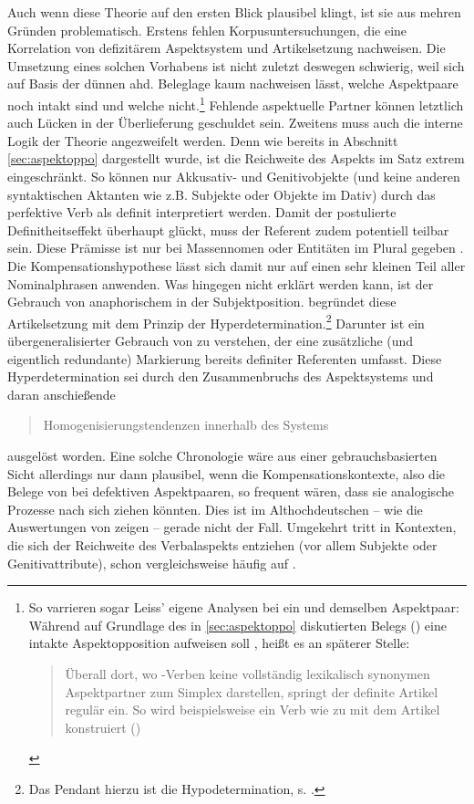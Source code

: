 Auch wenn diese Theorie auf den ersten Blick plausibel klingt, ist sie aus mehren Gründen problematisch. Erstens fehlen Korpusuntersuchungen, die eine Korrelation von defizitärem Aspektsystem und Artikelsetzung nachweisen. Die Umsetzung eines solchen Vorhabens ist nicht zuletzt deswegen schwierig, weil sich auf Basis der dünnen ahd. Beleglage kaum nachweisen lässt, welche Aspektpaare noch intakt sind und welche nicht.\footnote{So varrieren sogar Leiss' eigene Analysen bei ein und demselben Aspektpaar: Während  auf Grundlage des in \ref{sec:aspektoppo} diskutierten Belegs () eine intakte Aspektopposition aufweisen soll \parencite[171]{Leiss2000}, heißt es an späterer Stelle: \blockcquote[182]{Leiss2000}{Überall dort, wo -Verben keine vollständig lexikalisch synonymen Aspektpartner zum Simplex darstellen, springt der definite Artikel regulär ein. So wird beispielsweise ein Verb wie   zu   mit dem Artikel konstruiert ()}.} Fehlende aspektuelle Partner können letztlich auch Lücken in der Überlieferung geschuldet sein. Zweitens muss auch die interne Logik der Theorie angezweifelt werden. Denn wie bereits in Abschnitt \ref{sec:aspektoppo} dargestellt wurde, ist die Reichweite des Aspekts im Satz extrem eingeschränkt. So können nur Akkusativ- und Genitivobjekte (und keine anderen syntaktischen Aktanten wie z.B. Subjekte oder Objekte im Dativ) durch das perfektive Verb als definit interpretiert werden. Damit der postulierte Definitheitseffekt überhaupt glückt, muss der Referent zudem potentiell teilbar sein. Diese Prämisse ist nur bei Massennomen oder Entitäten im Plural gegeben \parencite{Heindl2016}. Die Kompensationshypothese lässt sich damit nur auf einen sehr kleinen Teil aller Nominalphrasen anwenden. Was hingegen nicht erklärt werden kann, ist der Gebrauch von anaphorischem  in der Subjektposition. \textcite{Leiss2000,Leiss2010} begründet diese Artikelsetzung mit dem Prinzip der Hyperdetermination.\footnote{Das Pendant hierzu ist die Hypodetermination, s. \textcite{Leiss2000}.} Darunter ist ein übergeneralisierter Gebrauch von  zu verstehen, der eine zusätzliche (und eigentlich redundante) Markierung bereits definiter Referenten umfasst. Diese Hyperdetermination sei durch den Zusammenbruchs des Aspektsystems und daran anschießende \blockcquote[196]{Leiss2000}{Homogenisierungstendenzen innerhalb des Systems} ausgelöst worden. Eine solche Chronologie wäre aus einer gebrauchsbasierten Sicht allerdings nur dann plausibel, wenn die Kompensationskontexte, also die Belege von  bei defektiven Aspektpaaren, so frequent wären, dass sie analogische Prozesse nach sich ziehen könnten. Dies ist im Althochdeutschen -- wie die Auswertungen von \textcite[170-181]{Leiss2000} zeigen -- gerade nicht der Fall. 
Umgekehrt tritt  in Kontexten, die sich der Reichweite des Verbalaspekts entziehen (vor allem Subjekte oder Genitivattribute), schon vergleichsweise häufig auf \parencite[s. z.B.][]{Oubouzar1992}.  

